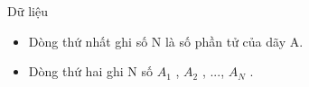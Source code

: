 Dữ liệu
\begin{itemize}
	\item     Dòng thứ nhất ghi số N là số phần tử của dãy A.   
	\item     Dòng thứ hai ghi N số $A_{1}$    , $A_{2}$    , ...,  $A_{N}$    .   
\end{itemize}